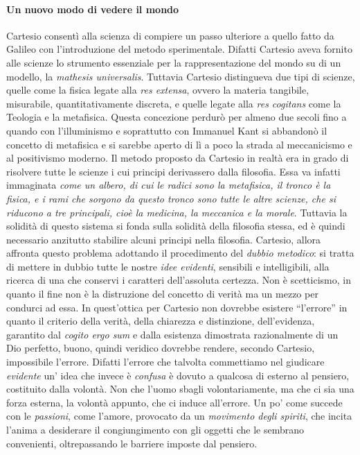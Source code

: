 \documentclass[a4paper,12pt]{report}
\begin{document}
\paragraph{Un nuovo modo di vedere il mondo}
Cartesio consentì alla scienza di compiere un passo ulteriore a quello fatto da Galileo con l’introduzione del metodo sperimentale. Difatti Cartesio aveva fornito alle scienze lo strumento essenziale per la rappresentazione del mondo su di un modello, la \textit{mathesis universalis}. Tuttavia Cartesio distingueva due tipi di scienze, quelle come la fisica legate alla \textit{res extensa}, ovvero la materia tangibile, misurabile, quantitativamente discreta, e quelle legate alla \textit{res cogitans} come la Teologia e la metafisica. Questa concezione perdurò per almeno due secoli fino a quando con l’illuminismo e soprattutto con Immanuel Kant si abbandonò il concetto di metafisica e si sarebbe aperto di lì a poco la strada al meccanicismo e al positivismo moderno.
Il metodo proposto da Cartesio in realtà era in grado di risolvere tutte le scienze i cui principi derivassero dalla filosofia. Essa va infatti immaginata \textit{come un albero, di cui le radici sono la  metafisica, il tronco è la fisica, e i rami che sorgono da questo tronco sono tutte le altre scienze, che si riducono a tre principali, cioè la medicina, la meccanica e la morale}.
Tuttavia la solidità di questo sistema si fonda sulla solidità della filosofia stessa, ed è quindi necessario anzitutto stabilire alcuni principi nella filosofia. Cartesio, allora affronta questo problema  adottando il procedimento del \textit{dubbio metodico}\cite{metameditazioni}: si tratta di mettere in dubbio tutte le nostre \textit{idee evidenti}, sensibili e intelligibili, alla ricerca di una che conservi i caratteri dell’assoluta certezza. Non è scetticismo, in quanto il fine non è la distruzione del concetto di verità ma un mezzo per condurci ad essa.
In quest’ottica per Cartesio non dovrebbe esistere “l’errore” in quanto il criterio della verità, della chiarezza e distinzione, dell'evidenza, garantito dal \textit{cogito ergo sum} e dalla esistenza dimostrata razionalmente di un Dio perfetto, buono, quindi veridico dovrebbe rendere, secondo Cartesio, impossibile l'errore. Difatti l’errore che talvolta commettiamo nel giudicare \textit{evidente} un’ idea che invece è \textit{confusa} è dovuto a qualcosa di esterno al pensiero, costituito dalla volontà. Non che l’uomo sbagli volontariamente, ma che ci sia una forza esterna, la volontà appunto, che ci induce all’errore. Un po’ come succede con le \textit{passioni}, come l’amore, provocato da un \textit{movimento degli spiriti}, che incita l’anima a desiderare il congiungimento con gli oggetti che le sembrano convenienti, oltrepassando le barriere imposte dal pensiero\cite{passioni}.
\end{document}
